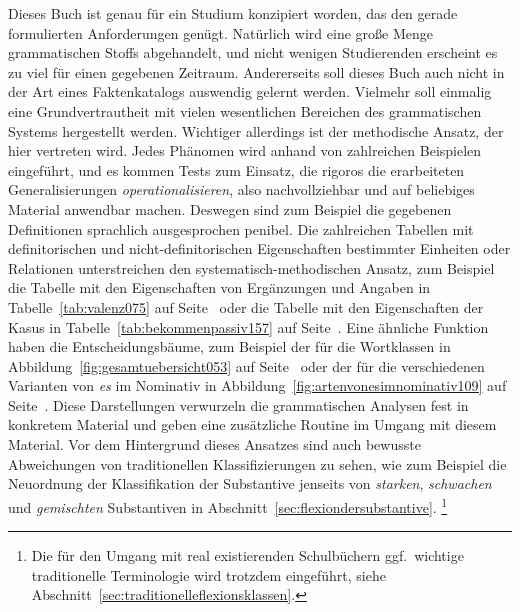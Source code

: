 Dieses Buch ist genau für ein Studium konzipiert worden, das den gerade formulierten Anforderungen genügt.
Natürlich wird eine große Menge grammatischen Stoffs abgehandelt, und nicht wenigen Studierenden erscheint es zu viel für einen gegebenen Zeitraum.
Andererseits soll dieses Buch auch nicht in der Art eines Faktenkatalogs auswendig gelernt werden.
Vielmehr soll einmalig eine Grundvertrautheit mit vielen wesentlichen Bereichen des grammatischen Systems hergestellt werden.
Wichtiger allerdings ist der methodische Ansatz, der hier vertreten wird.
Jedes Phänomen wird anhand von zahlreichen Beispielen eingeführt, und es kommen Tests zum Einsatz, die rigoros die erarbeiteten Generalisierungen \textit{operationalisieren}, also nachvollziehbar und auf beliebiges Material anwendbar machen.
Deswegen sind zum Beispiel die gegebenen Definitionen sprachlich ausgesprochen penibel.
Die zahlreichen Tabellen mit definitorischen und nicht-definitorischen Eigenschaften bestimmter Einheiten oder Relationen unterstreichen den systematisch-methodischen Ansatz, zum Beispiel die Tabelle mit den Eigenschaften von Ergänzungen und Angaben in Tabelle~\ref{tab:valenz075} auf Seite~\pageref{tab:valenz075} oder die Tabelle mit den Eigenschaften der Kasus in Tabelle~\ref{tab:bekommenpassiv157} auf Seite~\pageref{tab:bekommenpassiv157}.
Eine ähnliche Funktion haben die Entscheidungsbäume, zum Beispiel der für die Wortklassen in Abbildung~\ref{fig:gesamtuebersicht053} auf Seite~\pageref{fig:gesamtuebersicht053} oder der für die verschiedenen Varianten von \textit{es} im Nominativ in Abbildung~\ref{fig:artenvonesimnominativ109} auf Seite~\pageref{fig:artenvonesimnominativ109}.
Diese Darstellungen verwurzeln die grammatischen Analysen fest in konkretem Material und geben eine zusätzliche Routine im Umgang mit diesem Material.
Vor dem Hintergrund dieses Ansatzes sind auch bewusste Abweichungen von traditionellen Klassifizierungen zu sehen, wie zum Beispiel die Neuordnung der Klassifikation der Substantive jenseits von \textit{starken}, \textit{schwachen} und \textit{gemischten} Substantiven in Abschnitt~\ref{sec:flexiondersubstantive}.%
\footnote{Die für den Umgang mit real existierenden Schulbüchern ggf.\ wichtige traditionelle Terminologie wird trotzdem eingeführt, siehe Abschnitt~\ref{sec:traditionelleflexionsklassen}.}

